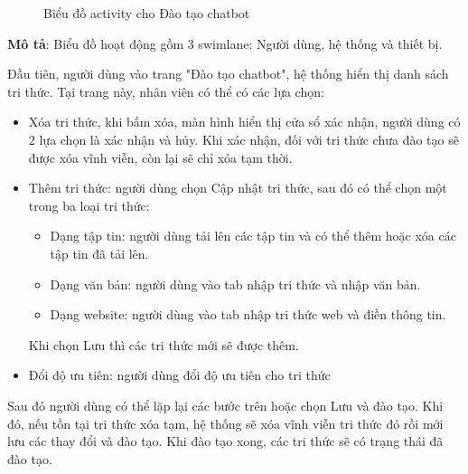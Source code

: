 \begin{figure}[H]
    \centering
     
    \vspace{0.5cm}
    \caption{Biểu đồ activity cho Đào tạo chatbot}
    \label{fig:enter-label}
\end{figure}
\textbf{Mô tả}: Biểu đồ hoạt động gồm 3 swimlane: Người dùng, hệ thống và thiết bị.

Đầu tiên, người dùng vào trang "Đào tạo chatbot", hệ thống hiển thị danh sách tri thức. Tại trang này, nhân viên có thể có các lựa chọn:
\begin{itemize}
	\item Xóa tri thức, khi bấm xóa, màn hình hiển thị cửa sổ xác nhận, người dùng có 2 lựa chọn là xác nhận và hủy. Khi xác nhận, đối với tri thức chưa đào tạo sẽ được xóa vĩnh viễn, còn lại sẽ chỉ xóa tạm thời.
	\item Thêm tri thức: người dùng chọn Cập nhật tri thức, sau đó có thể chọn một trong ba loại tri thức:
	\begin{itemize}
        \item Dạng tập tin: người dùng tải lên các tập tin và có thể thêm hoặc xóa các tập tin đã tải lên. 
        \item Dạng văn bản: người dùng vào tab nhập tri thức và nhập văn bản.
        \item Dạng website: người dùng vào tab nhập tri thức web và điền thông tin.
    \end{itemize}
    Khi chọn Lưu thì các tri thức mới sẽ được thêm.
    \item Đổi độ ưu tiên: người dùng đổi độ ưu tiên cho tri thức
\end{itemize} 

Sau đó người dùng có thể lặp lại các bước trên hoặc chọn Lưu và đào tạo. Khi đó, nếu tồn tại tri thức xóa tạm, hệ thống sẽ xóa vĩnh viễn tri thức đó rồi mới lưu các thay đổi và đào tạo. Khi đào tạo xong, các tri thức sẽ có trạng thái đã đào tạo.


%      



